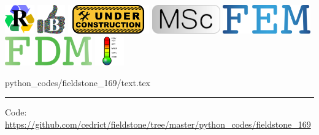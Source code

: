 \noindent
\includegraphics[height=1.25cm]{images/pictograms/replication}
\includegraphics[height=1.25cm]{images/pictograms/benchmark}
\includegraphics[height=1.25cm]{images/pictograms/under_construction}
\includegraphics[height=1.25cm]{images/pictograms/msc}
\includegraphics[height=1.25cm]{images/pictograms/FEM}
\includegraphics[height=1.25cm]{images/pictograms/FDM}
\includegraphics[height=1.25cm]{images/pictograms/temperature}


\begin{flushright} {\tiny {\color{gray} python\_codes/fieldstone\_169/text.tex}} \end{flushright}

%

\par\noindent\rule{\textwidth}{0.4pt}

\begin{center}
\inpython
{\small Code: \url{https://github.com/cedrict/fieldstone/tree/master/python_codes/fieldstone_169}}
\end{center}

